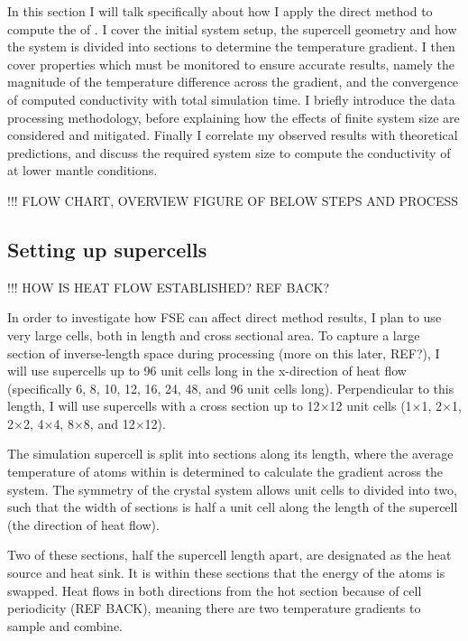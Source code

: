 In this section I will talk specifically about how I apply the direct method to compute the \tcs of \bdg. I cover the initial system setup, the supercell geometry and how the system is divided into sections to determine the temperature gradient. I then cover properties which must be monitored to ensure accurate results, namely the magnitude of the temperature difference across the gradient, and the convergence of computed conductivity with total simulation time. I briefly introduce the data processing methodology, before explaining how the effects of finite system size are considered and mitigated. Finally I correlate my observed results with theoretical predictions, and discuss the required system size to compute the conductivity of \bdgs at lower mantle conditions.

!!! FLOW CHART, OVERVIEW FIGURE OF BELOW STEPS AND PROCESS


\subsection{\label{sec:3.DM.cell}Setting up supercells}

!!! HOW IS HEAT FLOW ESTABLISHED? REF BACK?

In order to investigate how FSE can affect direct method results, I plan to use very large cells, both in length and cross sectional area. To capture a large section of inverse-length space during processing (more on this later, REF?), I will use supercells up to 96 unit cells long in the x-direction of heat flow (specifically 6, 8, 10, 12, 16, 24, 48, and 96 unit cells long). Perpendicular to this length, I will use supercells with a cross section up to 12$\times$12 unit cells (1$\times$1, 2$\times$1, 2$\times$2, 4$\times$4, 8$\times$8, and 12$\times$12).

The simulation supercell is split into sections along its length, where the average temperature of atoms within is determined to calculate the gradient across the system. The symmetry of the \bdgs crystal system allows unit cells to divided into two, such that the width of sections is half a unit cell along the length of the supercell (the direction of heat flow). 

Two of these sections, half the supercell length apart, are designated as the heat source and heat sink. It is within these sections that the energy of the atoms is swapped. Heat flows in both directions from the hot section because of cell periodicity (REF BACK), meaning there are two temperature gradients to sample and combine. 

